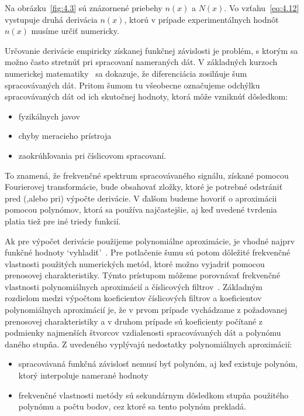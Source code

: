 Na obrázku~\ref{fig:4.3} sú znázornené priebehy $n(x)$ a $N(x)$. Vo
vzťahu~\ref{eq:4.12} vystupuje druhá derivácia $n(x)$, ktorú v prípade
experimentálnych hodnôt $n(x)$ musíme určiť numericky.

\par Určovanie derivácie empiricky získanej funkčnej závislosti je
problém, s ktorým sa možno často stretnúť pri spracovaní nameraných
dát. V základných kurzoch numerickej matematiky~\cite{4.19} sa
dokazuje, že diferenciácia zosilňuje šum spracovávaných dát. Pritom
šumom tu všeobecne označujeme odchýlku spracovávaných dát od ich
skutočnej hodnoty, ktorá môže vzniknúť dôsledkom:

\begin{itemize}
\item fyzikálnych javov
\item chyby meracieho prístroja
\item zaokrúhľovania pri číslicovom spracovaní.
\end{itemize}

\par To znamená, že frekvenčné spektrum spracovávaného signálu,
získané pomocou Fourierovej transformácie, bude obsahovať zložky,
ktoré je potrebné odstrániť pred (,alebo pri) výpočte derivácie. V
ďalšom budeme hovoriť o aproximácii pomocou polynómov, ktorá sa
používa najčastejšie, aj keď uvedené tvrdenia platia tiež pre iné
triedy funkcií.

\par Ak pre výpočet derivácie použijeme polynomiálne aproximácie, je
vhodné najprv funkčné hodnoty `vyhladiť'~\cite{4.20}. Pre potlačenie
šumu sú potom dôležité frekvenčné vlastnosti použitých numerických
metód, ktoré možno vyjadriť pomocou prenosovej charakteristiky. Týmto
prístupom môžeme porovnávať frekvenčné vlastnosti polynomiálnych
aproximácií a číslicových filtrov~\cite{4.21}.  Základným rozdielom
medzi výpočtom koeficientov číslicových filtrov a koeficientov
polynomiálnych aproximácií je, že v prvom prípade vychádzame z
požadovanej prenosovej charakteristiky a v druhom prípade sú
koeficienty počítané z podmienky najmenších štvorcov vzdialenosti
spracovávaných dát a polynómu daného stupňa. Z uvedeného vyplývajú
nedostatky polynomiálnych aproximácií:

\begin{itemize}
\item spracovávaná funkčná závislosť nemusí byť polynóm, aj keď
  existuje polynóm, ktorý interpoluje namerané hodnoty
\item frekvenčné vlastnosti metódy sú sekundárnym dôsledkom stupňa
  použitého polynómu a počtu bodov, cez ktoré sa tento polynóm
  prekladá.
\end{itemize}

